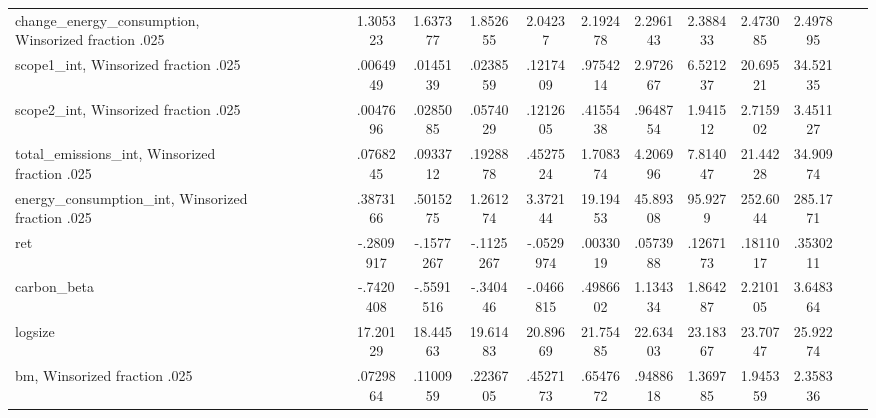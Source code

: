\begin{table}[htbp]
\begin{tabular}{l*{1}{ccccccccccccccccc}}
change\_energy\_consumption, Winsorized fraction .025&            &            &            &            &            &            &    1.305323&    1.637377&    1.852655&     2.04237&    2.192478&    2.296143&    2.388433&    2.473085&    2.497895&            &            \\
scope1\_int, Winsorized fraction .025&            &            &            &            &            &            &    .0064949&    .0145139&    .0238559&    .1217409&    .9754214&    2.972667&    6.521237&    20.69521&    34.52135&            &            \\
scope2\_int, Winsorized fraction .025&            &            &            &            &            &            &    .0047696&    .0285085&    .0574029&    .1212605&    .4155438&    .9648754&    1.941512&    2.715902&    3.451127&            &            \\
total\_emissions\_int, Winsorized fraction .025&            &            &            &            &            &            &    .0768245&    .0933712&    .1928878&    .4527524&    1.708374&    4.206996&    7.814047&    21.44228&    34.90974&            &            \\
energy\_consumption\_int, Winsorized fraction .025&            &            &            &            &            &            &    .3873166&    .5015275&    1.261274&    3.372144&    19.19453&    45.89308&     95.9279&    252.6044&    285.1771&            &            \\
ret                 &            &            &            &            &            &            &   -.2809917&   -.1577267&   -.1125267&   -.0529974&    .0033019&    .0573988&    .1267173&    .1811017&    .3530211&            &            \\
carbon\_beta         &            &            &            &            &            &            &   -.7420408&   -.5591516&    -.340446&   -.0466815&    .4986602&    1.134334&    1.864287&    2.210105&    3.648364&            &            \\
logsize             &            &            &            &            &            &            &    17.20129&    18.44563&    19.61483&    20.89669&    21.75485&    22.63403&    23.18367&    23.70747&    25.92274&            &            \\
bm, Winsorized fraction .025&            &            &            &            &            &            &    .0729864&    .1100959&    .2236705&    .4527173&    .6547672&    .9488618&    1.369785&    1.945359&    2.358336&            &            \\

\end{tabular}
\end{table}
